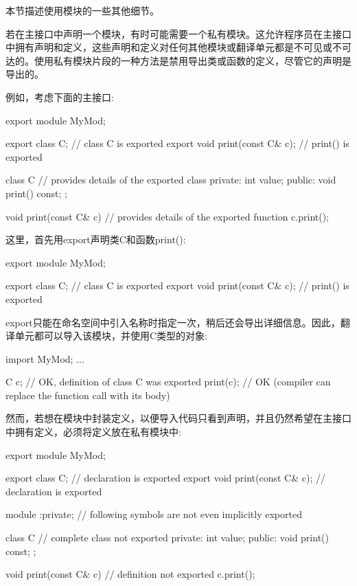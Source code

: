 
本节描述使用模块的一些其他细节。


若在主接口中声明一个模块，有时可能需要一个私有模块。这允许程序员在主接口中拥有声明和定义，这些声明和定义对任何其他模块或翻译单元都是不可见或不可达的。使用私有模块片段的一种方法是禁用导出类或函数的定义，尽管它的声明是导出的。

例如，考虑下面的主接口:

\begin{cpp}
export module MyMod;

export class C; // class C is exported
export void print(const C& c); // print() is exported

class C { // provides details of the exported class
private:
	int value;
public:
	void print() const;
};

void print(const C& c) { // provides details of the exported function
	c.print();
}
\end{cpp}

这里，首先用export声明类C和函数print():

\begin{cpp}
export module MyMod;

export class C; // class C is exported
export void print(const C& c); // print() is exported
\end{cpp}

export只能在命名空间中引入名称时指定一次，稍后还会导出详细信息。因此，翻译单元都可以导入该模块，并使用C类型的对象:

\begin{cpp}
import MyMod;
...

C c; // OK, definition of class C was exported
print(c); // OK (compiler can replace the function call with its body)
\end{cpp}

然而，若想在模块中封装定义，以便导入代码只看到声明，并且仍然希望在主接口中拥有定义，必须将定义放在私有模块中:

\begin{cpp}
export module MyMod;

export class C; // declaration is exported
export void print(const C& c); // declaration is exported

module :private; // following symbols are not even implicitly exported

class C { // complete class not exported
	private:
	int value;
	public:
	void print() const;
};

void print(const C& c) { // definition not exported
	c.print();
}
\end{cpp}

